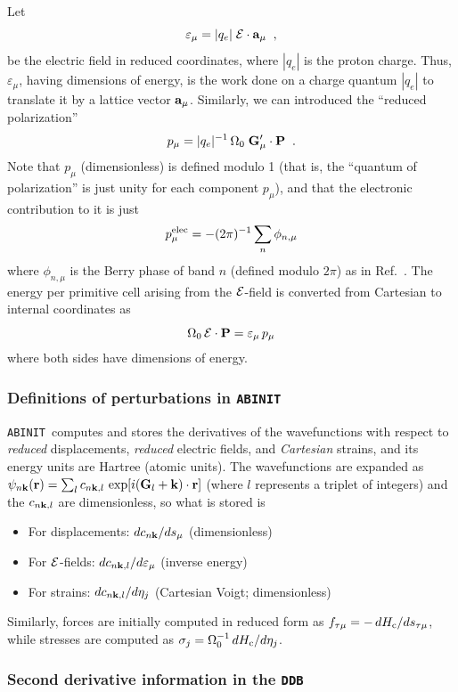 \documentclass[11pt,fleqn]{article}
\def\beq{\begin{equation}}
\def\eeq{\end{equation}}
\def\P{{\bf P}}
\def\a{{\bf a}}
\def\E{{\cal E}}
\def\G{{\bf G}}
\def\r{{\bf r}}
\def\k{{\bf k}}
\def\Oo{\Omega_0}
\def\bc{_{\rm c}}
\def\veps{\varepsilon}
\def\ABINIT{{{\tt ABINIT}}}
\def\DDB{{\tt DDB}}
\begin{document}
Let
%
\beq
\veps_\mu=|q_e|\;\E\cdot \a_\mu \;\;,
\eeq
%
be the electric field in reduced coordinates, where $|q_e|$ is the
proton charge.  Thus, $\veps_\mu$, having dimensions of energy, is
the work done on a charge quantum $|q_e|$ to translate it by a lattice
vector $\a_\mu$.  Similarly, we can introduced the ``reduced
polarization''
%
\beq
p_\mu=|q_e|^{-1}\,\Oo\;\G'_\mu\cdot\P
\;\;.
\eeq
%
Note that $p_\mu$ (dimensionless) is defined modulo 1
(that is, the ``quantum of
polarization'' is just unity for each component $p_\mu$), and
that the electronic contribution to it is just
%
\beq
p_\mu^{\rm elec}=-(2\pi)^{-1}\sum_n\phi_{n,\mu}
\label{eq:pelec}
\eeq
%
where $\phi_{n,\mu}$ is the Berry phase of band $n$ (defined modulo
$2\pi$) as in Ref.~\cite{dv-piezo}.  The energy per primitive cell
arising from the $\E$-field is converted from Cartesian to internal
coordinates as
%
\beq
\Oo\,\E\cdot\P=\veps_\mu\,p_\mu
\label{eq:epterm}
\eeq
%
where both sides have dimensions of energy.

\subsubsection{Definitions of perturbations in \ABINIT}

\ABINIT\ computes and stores the
derivatives of the wavefunctions with respect to {\it reduced}
displacements, {\it reduced} electric fields, and {\it Cartesian}
strains, and its energy units are Hartree (atomic units).
The wavefunctions are expanded as $\psi_{n\k}(\r)=\sum_l c_{n\k,l}\,
\exp[i(\G_l+\k)\cdot\r]$ (where $l$ represents a triplet of integers)
and the $c_{n\k,l}$ are dimensionless, so what is stored is
%
\begin{itemize}
\item For displacements: $d c_{n\k}/d s_\mu$ (dimensionless)
\item For $\E$-fields: $d c_{n\k,l}/d \veps_\mu$ (inverse energy)
\item For strains: $d c_{n\k,l}/d \eta_j$ (Cartesian Voigt;
   dimensionless)
\end{itemize}
%
Similarly, forces are initially computed in reduced form
as $f_{\tau\mu}=-\,dH\bc/ds_{\tau\mu}$, while stresses are
computed as $\sigma_j=\Oo^{-1}\,dH\bc/d\eta_j$.

\subsubsection{Second derivative information in the \DDB}
\label{sec:ddbinfo}
\end{document}

